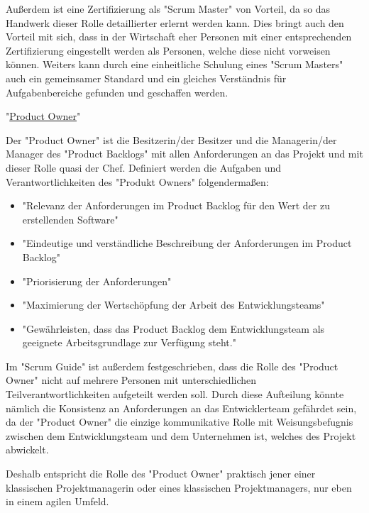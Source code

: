 Außerdem ist eine Zertifizierung als "Scrum Master" von Vorteil, da so das Handwerk dieser Rolle detaillierter erlernt werden kann. Dies bringt auch den Vorteil mit sich, dass in der Wirtschaft eher Personen mit einer entsprechenden Zertifizierung eingestellt werden als Personen, welche diese nicht vorweisen können. Weiters kann durch eine einheitliche Schulung eines "Scrum Masters" auch ein gemeinsamer Standard und ein gleiches Verständnis für Aufgabenbereiche gefunden und geschaffen werden. \cite{ScrumMaster}

"\underline{Product Owner}" \label{sec:productowner}

Der "Product Owner" ist die Besitzerin/der Besitzer und die Managerin/der Manager des "Product Backlogs" mit allen Anforderungen an das Projekt und mit dieser Rolle quasi der Chef. Definiert werden die Aufgaben und Verantwortlichkeiten des "Produkt Owners" folgendermaßen: \cite{ProductOwner}

\begin{itemize}
    \item "Relevanz der Anforderungen im Product Backlog für den Wert der zu erstellenden Software" \cite{ProductOwner}
    \item "Eindeutige und verständliche Beschreibung der Anforderungen im Product Backlog" \cite{ProductOwner}
    \item "Priorisierung der Anforderungen" \cite{ProductOwner}
    \item "Maximierung der Wertschöpfung der Arbeit des Entwicklungsteams" \cite{ProductOwner}
    \item "Gewährleisten, dass das Product Backlog dem Entwicklungsteam als geeignete Arbeitsgrundlage zur Verfügung steht." \cite{ProductOwner}
\end{itemize}

Im "Scrum Guide" ist außerdem festgeschrieben, dass die Rolle des "Product Owner" nicht auf mehrere Personen mit unterschiedlichen Teilverantwortlichkeiten aufgeteilt werden soll. Durch diese Aufteilung könnte nämlich die Konsistenz an Anforderungen an das Entwicklerteam gefährdet sein, da der "Product Owner" die einzige kommunikative Rolle mit Weisungsbefugnis zwischen dem Entwicklungsteam und dem Unternehmen ist, welches des Projekt abwickelt. \cite{ProductOwner}

Deshalb entspricht die Rolle des "Product Owner" praktisch jener einer klassischen Projektmanagerin oder eines klassischen Projektmanagers, nur eben in einem agilen Umfeld. \cite{ProductOwner}

